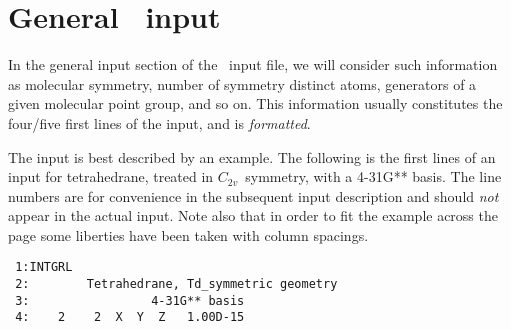 \section{General \mol\ input}\label{sec:molgeneral}

In the general input section of the \mol\ input file, we will consider
such information as molecular symmetry, number of
symmetry distinct atoms, generators of a
given molecular point group, and so on.
This information usually constitutes the four/five first lines of the
input, and is {\em formatted}.

The input is best described by an example.
The following is the first lines of an input for
tetrahedrane, treated in
$C_{2v}$~symmetry, with a 4-31G** basis.  The line numbers are for
convenience in the subsequent input description and should {\em
not} appear in the actual input.  Note also that in order to fit
the example across the page some liberties have been taken with
column spacings.
\begin{verbatim}
 1:INTGRL
 2:        Tetrahedrane, Td_symmetric geometry
 3:                 4-31G** basis
 4:    2    2  X  Y  Z   1.00D-15
\end{verbatim}

